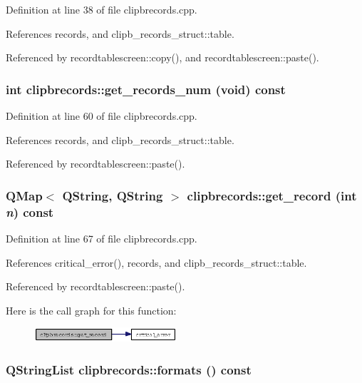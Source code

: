 Definition at line 38 of file clipbrecords.cpp.

References records, and clipb\_\-records\_\-struct::table.

Referenced by recordtablescreen::copy(), and recordtablescreen::paste().
\subsubsection{\setlength{\rightskip}{0pt plus 5cm}int clipbrecords::get\_\-records\_\-num (void) const}\label{classclipbrecords_bb594290bb70e0dc9d66237ed272e173}




Definition at line 60 of file clipbrecords.cpp.

References records, and clipb\_\-records\_\-struct::table.

Referenced by recordtablescreen::paste().
\subsubsection{\setlength{\rightskip}{0pt plus 5cm}QMap$<$ QString, QString $>$ clipbrecords::get\_\-record (int {\em n}) const}\label{classclipbrecords_539c2263d9314dc24cd47b833bbcac8a}




Definition at line 67 of file clipbrecords.cpp.

References critical\_\-error(), records, and clipb\_\-records\_\-struct::table.

Referenced by recordtablescreen::paste().

Here is the call graph for this function:\begin{figure}[H]
\begin{center}
\leavevmode
\includegraphics[width=150pt]{classclipbrecords_539c2263d9314dc24cd47b833bbcac8a_cgraph}
\end{center}
\end{figure}
\subsubsection{\setlength{\rightskip}{0pt plus 5cm}QString\-List clipbrecords::formats () const}\label{classclipbrecords_5cf9602a5d64022c46dd8a31479788a9}




